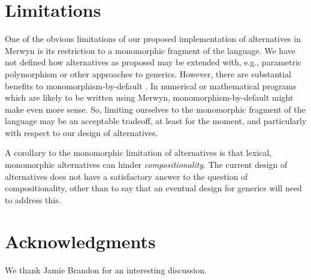\documentclass{article}
\renewcommand{\=}{\triangleq}
\begin{document}
\section{Limitations}

One of the obvious limitations of
our proposed implementation of alternatives in Merwyn is its restriction to
a monomorphic fragment of the language.
We have not defined how alternatives as proposed may be extended with,
e.g., parametric polymorphism or other approaches to generics.
However, there are substantial benefits to monomorphism-by-default
\cite{vytiniotis10}.
In numerical or mathematical programs which are likely to be written using
Merwyn,
monomorphism-by-default might make even more sense.
So, limiting ourselves to the monomorphic fragment of the language may be
an acceptable tradeoff, at least for the moment,
and particularly with respect to our design of alternatives.

A corollary to the monomorphic limitation of alternatives is that
lexical, monomorphic alternatives can hinder \emph{compositionality}.
The current design of alternatives does not have a satisfactory answer to
the question of compositionality, other than to say that an eventual design
for generics will need to address this.

\section*{Acknowledgments}

We thank Jamie Brandon for an interesting discussion.



\end{document}
